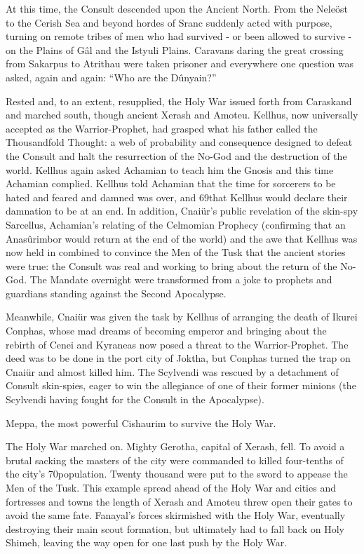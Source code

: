 \documentclass[]{book}
\begin{document}
At this time, the Consult descended upon the Ancient North. From the Neleöst to the
Cerish Sea and beyond hordes of Sranc suddenly acted with purpose, turning on
remote tribes of men who had survived - or been allowed to survive - on the Plains of
Gâl and the Istyuli Plains. Caravans daring the great crossing from Sakarpus to Atrithau
were taken prisoner and everywhere one question was asked, again and again: ``Who are
the Dûnyain?''

Rested and, to an extent, resupplied, the Holy War issued forth from Caraskand and
marched south, though ancient Xerash and Amoteu. Kellhus, now universally accepted
as the Warrior-Prophet, had grasped what his father called the Thousandfold Thought:
a web of probability and consequence designed to defeat the Consult and halt the
resurrection of the No-God and the destruction of the world. Kellhus again asked
Achamian to teach him the Gnosis and this time Achamian complied. Kellhus told
Achamian that the time for sorcerers to be hated and feared and damned was over, and
69that Kellhus would declare their damnation to be at an end. In addition, Cnaiür's
public revelation of the skin-spy Sarcellus, Achamian's relating of the Celmomian
Prophecy (confirming that an Anasûrimbor would return at the end of the world) and
the awe that Kellhus was now held in combined to convince the Men of the Tusk that
the ancient stories were true: the Consult was real and working to bring about the
return of the No-God. The Mandate overnight were transformed from a joke to
prophets and guardians standing against the Second Apocalypse.

Meanwhile, Cnaiür was given the task by Kellhus of arranging the death of Ikurei
Conphas, whose mad dreams of becoming emperor and bringing about the rebirth of
Cenei and Kyraneas now posed a threat to the Warrior-Prophet. The deed was to be
done in the port city of Joktha, but Conphas turned the trap on Cnaiür and almost
killed him. The Scylvendi was rescued by a detachment of Consult skin-spies, eager to
win the allegiance of one of their former minions (the Scylvendi having fought for the
Consult in the Apocalypse).

Meppa, the most powerful Cishaurim to survive the Holy War.

The Holy War marched on. Mighty Gerotha, capital of Xerash, fell. To avoid a brutal
sacking the masters of the city were commanded to killed four-tenths of the city's
70population. Twenty thousand were put to the sword to appease the Men of the Tusk.
This example spread ahead of the Holy War and cities and fortresses and towns the
length of Xerash and Amoteu threw open their gates to avoid the same fate. Fanayal's
forces skirmished with the Holy War, eventually destroying their main scout formation,
but ultimately had to fall back on Holy Shimeh, leaving the way open for one last push
by the Holy War.
\end{document}
